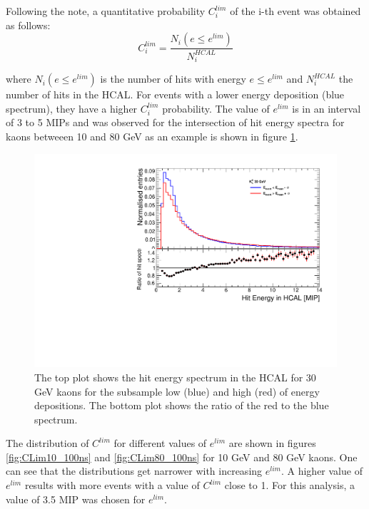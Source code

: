 Following the note, a quantitative probability $C_{i}^{lim}$ of the i-th event was obtained as follows:
\begin{equation}
  C_{i}^{lim} = \frac{N_{i}(e \leq e^{lim})}{N_{i}^{HCAL}}
\end{equation}

where $N_{i}(e \leq e^{lim})$ is the number of hits with energy $e \leq e^{lim}$ and $N_{i}^{HCAL}$ the number of hits in the HCAL. For events with a lower energy deposition (blue spectrum), they have a higher $C_{i}^{lim}$ probability. The value of $e^{lim}$ is in an interval of 3 to 5 MIPs and was observed for the intersection of hit energy spectra for kaons betweeen 10 and 80 GeV as an example is shown in figure \ref{fig:HitSpectra30_Zoom_100ns}.

\begin{figure}[htbp!]
  \centering
  \includegraphics[width=0.7\linewidth]{../Thesis_Plots/ILD/AdditionalPlots/Plots/HitEnergySpectra_Zoom_100ns_30GeV.pdf}
  \caption{The top plot shows the hit energy spectrum in the HCAL for 30 GeV kaons for the subsample low (blue) and high (red) of energy depositions. The bottom plot shows the ratio of the red to the blue spectrum.} \label{fig:HitSpectra30_Zoom_100ns}
\end{figure}

The distribution of $C^{lim}$ for different values of $e^{lim}$ are shown in figures \ref{fig:CLim10_100ns} and \ref{fig:CLim80_100ns} for 10 GeV and 80 GeV kaons. One can see that the distributions get narrower with increasing $e^{lim}$. A higher value of $e^{lim}$ results with more events with a value of $C^{lim}$ close to 1. For this analysis, a value of 3.5 MIP was chosen for $e^{lim}$.

